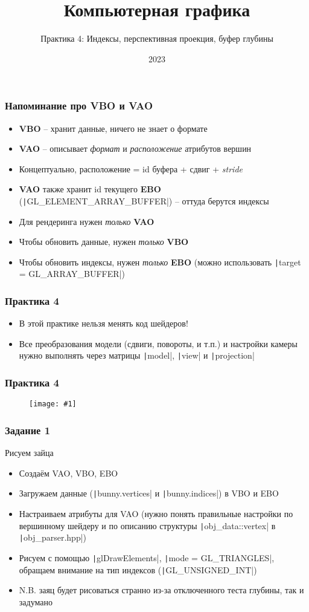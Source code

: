 \documentclass[10pt]{beamer}
\title{Компьютерная графика}
\subtitle{Практика 4: Индексы, перспективная проекция, буфер глубины}
\date{2023}
\newcommand{\slideimage}[1]{
  \begin{figure}
    \begin{adjustbox}{width=\textwidth, totalheight=\textheight-2\baselineskip-2\baselineskip,keepaspectratio}
      \texttt{[image: \#1]}
    \end{adjustbox}
  \end{figure}
}
\begin{document}
\frame{\titlepage}

\begin{frame}[fragile]
\frametitle{Напоминание про VBO и VAO}
\begin{itemize}
\item \textbf{VBO} -- хранит данные, ничего не знает о формате
\item \textbf{VAO} -- описывает \textit{формат} и \textit{расположение} атрибутов вершин
\item Концептуально, расположение = id буфера + сдвиг + \textit{stride}
\item \textbf{VAO} также хранит id текущего \textbf{EBO} (\texttt|GL_ELEMENT_ARRAY_BUFFER|) -- оттуда берутся индексы
\item Для рендеринга нужен \textit{только} \textbf{VAO}
\item Чтобы обновить данные, нужен \textit{только} \textbf{VBO}
\item Чтобы обновить индексы, нужен \textit{только} \textbf{EBO} (можно использовать \texttt|target = GL_ARRAY_BUFFER|)
\end{itemize}
\end{frame}

\begin{frame}[fragile]
\frametitle{Практика 4}
\begin{itemize}
\item В этой практике нельзя менять код шейдеров!
\item Все преобразования модели (сдвиги, повороты, и т.п.) и настройки камеры нужно выполнять через матрицы \texttt|model|, \texttt|view| и \texttt|projection|
\end{itemize}
\end{frame}

\begin{frame}[fragile]
\frametitle{Практика 4}
\slideimage{0.png}
\end{frame}

\begin{frame}[fragile]
\frametitle{Задание 1}
Рисуем зайца
\begin{itemize}
\item Создаём VAO, VBO, EBO
\item Загружаем данные (\texttt|bunny.vertices| и \texttt|bunny.indices|) в VBO и EBO
\item Настраиваем атрибуты для VAO (нужно понять правильные настройки по вершинному шейдеру и по описанию структуры \texttt|obj_data::vertex| в \texttt|obj_parser.hpp|)
\item Рисуем с помощью \texttt|glDrawElements|, \texttt|mode = GL_TRIANGLES|, обращаем внимание на тип индексов (\texttt|GL_UNSIGNED_INT|)
\item N.B. заяц будет рисоваться странно из-за отключенного теста глубины, так и задумано
\end{itemize}
\end{frame}
\end{document}

